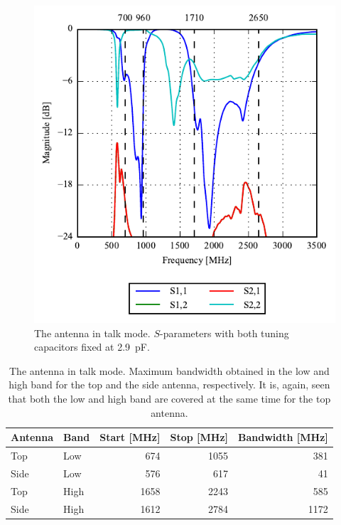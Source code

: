 \begin{figure}[htbp]
    \centering
    \includegraphics{img/tech_sol/nonresonant/simulation/talk_mode/s_params_cMax.pdf}
    \caption{The antenna in talk mode. $S$-parameters with both tuning capacitors fixed at \SI{2.9}{pF}.}
    \label{fig:ant3_sparam_talk}
\end{figure}

\begin{table}[htbp]
    \centering
    \begin{tabular}{|l|l|r|r|r|}
        \hline
        Antenna & Band & Start [MHz] & Stop [MHz] & Bandwidth [MHz] \\
        \hline
        Top     & Low  & 674         & 1055       & 381 \\
        Side    & Low  & 576         & 617        & 41   \\
        \hline
        Top     & High & 1658         & 2243       & 585 \\
        Side    & High & 1612        & 2784       & 1172 \\
        \hline
    \end{tabular}
    \caption{The antenna in talk mode. Maximum bandwidth obtained in the low and high band for the top and the side antenna, respectively. It is, again, seen that both the low and high band are covered at the same time for the top antenna.}
    \label{tab:bw_sol3talk}
\end{table}

